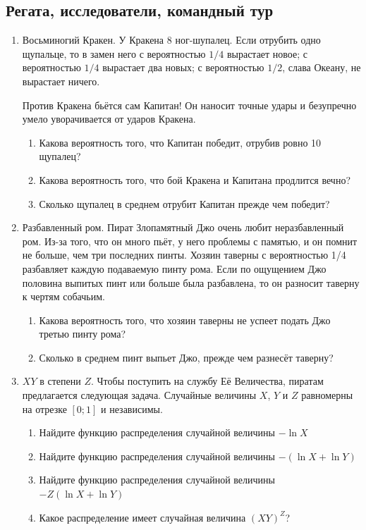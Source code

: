 \documentclass[12pt, a4paper]{article}\usepackage[]{graphicx}\usepackage[]{color}
\begin{document}
\subsection{Регата, исследователи, командный тур}

\begin{enumerate}
\item Восьминогий Кракен. У Кракена 8 ног-шупалец. Если отрубить одно щупальце, то в замен него с вероятностью $1/4$ вырастает новое; с вероятностью $1/4$ вырастает два новых; с вероятностью $1/2$, слава Океану, не вырастает ничего.

Против Кракена бьётся сам Капитан! Он наносит точные удары и безупречно умело уворачивается от ударов Кракена.

\begin{enumerate}
\item Какова вероятность того, что Капитан победит, отрубив ровно 10 щупалец?
\item Какова вероятность того, что бой Кракена и Капитана продлится вечно?
\item Сколько щупалец в среднем отрубит Капитан прежде чем победит?
\end{enumerate}

\item Разбавленный ром. Пират Злопамятный Джо очень любит неразбавленный ром. Из-за
того, что он много пьёт, у него проблемы с памятью, и он помнит не
больше, чем три последних пинты. Хозяин таверны с вероятностью 1/4 разбавляет
каждую подаваемую пинту рома. Если по ощущением Джо половина выпитых
пинт или больше была разбавлена, то он разносит таверну к чертям
собачьим.


\begin{enumerate}
\item Какова вероятность того, что хозяин таверны не успеет подать Джо третью пинту рома?
\item Сколько в среднем пинт выпьет Джо, прежде чем разнесёт таверну?
\end{enumerate}

\item $XY$ в степени $Z$. Чтобы поступить на службу Её Величества, пиратам предлагается следующая задача. Случайные величины $X$, $Y$ и $Z$ равномерны на отрезке $[0;1]$ и независимы.

\begin{enumerate}
\item Найдите функцию распределения случайной величины $-\ln X$
\item Найдите функцию распределения случайной величины $-(\ln X + \ln Y)$
\item Найдите функцию распределения случайной величины $-Z(\ln X + \ln Y)$
\item Какое распределение имеет случайная величина $(XY)^Z$?
\end{enumerate}


\end{enumerate}
\end{document}
